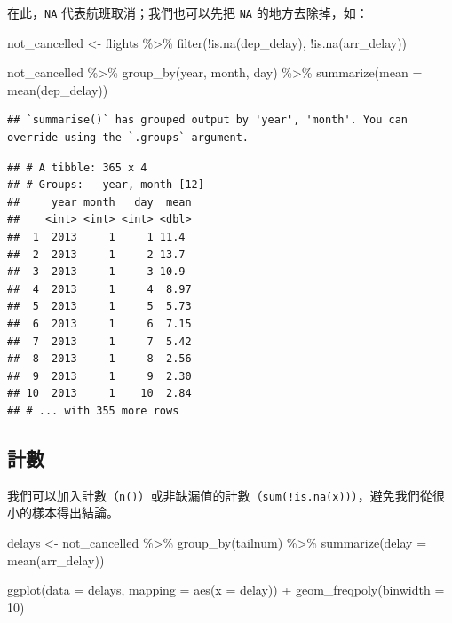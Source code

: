 \documentclass[
]{book}
\newenvironment{Shaded}{\begin{snugshade}}{\end{snugshade}}
\newcommand{\AttributeTok}[1]{\textcolor[rgb]{0.77,0.63,0.00}{#1}}
\newcommand{\DecValTok}[1]{\textcolor[rgb]{0.00,0.00,0.81}{#1}}
\newcommand{\FunctionTok}[1]{\textcolor[rgb]{0.00,0.00,0.00}{#1}}
\newcommand{\NormalTok}[1]{#1}
\newcommand{\OtherTok}[1]{\textcolor[rgb]{0.56,0.35,0.01}{#1}}
\newcommand{\SpecialCharTok}[1]{\textcolor[rgb]{0.00,0.00,0.00}{#1}}
\theoremstyle{definition}
\theoremstyle{remark}
\begin{document}
在此，\texttt{NA} 代表航班取消；我們也可以先把 \texttt{NA} 的地方去除掉，如：

\begin{Shaded}
\begin{Highlighting}[]
\NormalTok{not\_cancelled }\OtherTok{\textless{}{-}}\NormalTok{ flights }\SpecialCharTok{\%\textgreater{}\%}
  \FunctionTok{filter}\NormalTok{(}\SpecialCharTok{!}\FunctionTok{is.na}\NormalTok{(dep\_delay), }\SpecialCharTok{!}\FunctionTok{is.na}\NormalTok{(arr\_delay))}

\NormalTok{not\_cancelled }\SpecialCharTok{\%\textgreater{}\%}
  \FunctionTok{group\_by}\NormalTok{(year, month, day) }\SpecialCharTok{\%\textgreater{}\%}
  \FunctionTok{summarize}\NormalTok{(}\AttributeTok{mean =} \FunctionTok{mean}\NormalTok{(dep\_delay))}
\end{Highlighting}
\end{Shaded}

\begin{verbatim}
## `summarise()` has grouped output by 'year', 'month'. You can override using the `.groups` argument.
\end{verbatim}

\begin{verbatim}
## # A tibble: 365 x 4
## # Groups:   year, month [12]
##     year month   day  mean
##    <int> <int> <int> <dbl>
##  1  2013     1     1 11.4 
##  2  2013     1     2 13.7 
##  3  2013     1     3 10.9 
##  4  2013     1     4  8.97
##  5  2013     1     5  5.73
##  6  2013     1     6  7.15
##  7  2013     1     7  5.42
##  8  2013     1     8  2.56
##  9  2013     1     9  2.30
## 10  2013     1    10  2.84
## # ... with 355 more rows
\end{verbatim}

\hypertarget{ux8a08ux6578}{%
\subsection{計數}\label{ux8a08ux6578}}

我們可以加入計數（\texttt{n()}）或非缺漏值的計數（\texttt{sum(!is.na(x))}），避免我們從很小的樣本得出結論。

\begin{Shaded}
\begin{Highlighting}[]
\NormalTok{delays }\OtherTok{\textless{}{-}}\NormalTok{ not\_cancelled }\SpecialCharTok{\%\textgreater{}\%}
  \FunctionTok{group\_by}\NormalTok{(tailnum) }\SpecialCharTok{\%\textgreater{}\%}
  \FunctionTok{summarize}\NormalTok{(}\AttributeTok{delay =} \FunctionTok{mean}\NormalTok{(arr\_delay))}

\FunctionTok{ggplot}\NormalTok{(}\AttributeTok{data =}\NormalTok{ delays, }\AttributeTok{mapping =} \FunctionTok{aes}\NormalTok{(}\AttributeTok{x =}\NormalTok{ delay)) }\SpecialCharTok{+}
  \FunctionTok{geom\_freqpoly}\NormalTok{(}\AttributeTok{binwidth =} \DecValTok{10}\NormalTok{)}
\end{Highlighting}
\end{Shaded}
\end{document}
